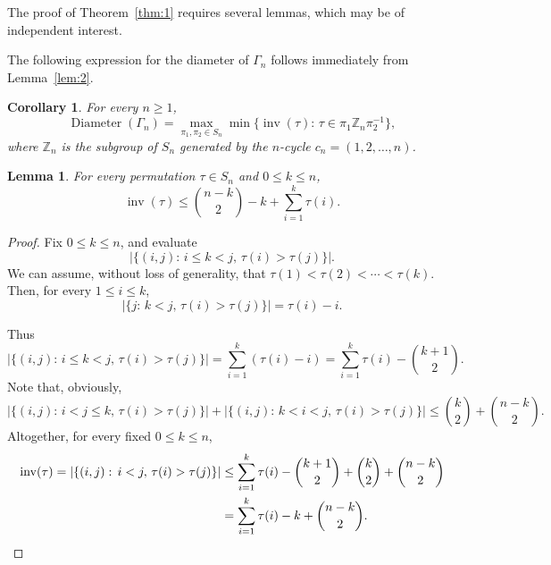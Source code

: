 \documentclass[11pt]{amsart}
\newtheorem{lemma}[theorem]{Lemma}
\newtheorem{corollary}[theorem]{Corollary}
\numberwithin{equation}{section}
\newcommand{\todo}[1]{\vspace{5 mm}\par \noindent
\marginpar{\textsc{ToDo}} \framebox{\begin{minipage}[c]{0.95
\textwidth}
 #1 \end{minipage}}\vspace{5 mm}\par}
\newcommand{\ZZ}{{\mathbb {Z}}}
\newcommand{\inv}{{\operatorname{inv}}}
\newcommand{\D}{{\operatorname{Diameter}}}
\begin{document}
The proof of Theorem~\ref{thm:1} requires several lemmas, which may be of independent interest. 

The following expression for the diameter of $\Gamma_n$ follows immediately from Lemma~\ref{lem:2}.

\begin{corollary}\label{cor:diam} 
For every $n\ge 1$,
    \[
        \D(\Gamma_n)
        = \max_{\pi_1,\pi_2 \in S_n} \min \{\inv(\tau) :\, \tau \in \pi_1 \ZZ_n \pi_2^{-1}\},
    \]
    where $\ZZ_n$ is the subgroup of $S_n$ generated by the $n$-cycle $c_n =(1,2,\dots,n)$.
\end{corollary}

\begin{lemma}\label{obs:4}
For every permutation $\tau\in S_n$ and $0\le k\le n$, 
\[
    \inv(\tau)
    \le \binom{n-k}{2}-k + \sum_{i=1}^k \tau(i).  
\]
\end{lemma}

\begin{proof} 
Fix $0\le k\le n$, and evaluate 
\[
   |\{(i,j) :\, i\le k<j,\, \tau(i)>\tau(j)\}|. 
\]
We can assume, without loss of generality, that $\tau(1)<\tau(2)<\cdots<\tau(k)$. 
Then, for every $1\le i\le k$,
\[
    |\{j :\, k<j,\, \tau(i)>\tau(j)\}|=\tau(i)-i.
\]


Thus  
\[
   |\{(i,j) :\, i\le k<j,\, \tau(i)>\tau(j)\}| 
   = \sum_{i=1}^k (\tau(i)-i)
   = \sum_{i=1}^k \tau(i) - \binom{k+1}{2}.
\]
Note that, obviously, 
\[
    |\{(i,j) :\, i< j \le k,\, \tau(i)>\tau(j)\}| +
    |\{(i,j) :\, k < i < j,\, \tau(i)>\tau(j)\}|
    \le \binom{k}{2} + \binom{n-k}{2}. 
\]
Altogether, 
for every fixed $0\le k\le n$,
\begin{align*}
    \inv(\tau)
    = |\{(i,j) :\, i<j,\, \tau(i)>\tau(j)\}| 
    &\le \sum_{i=1}^k \tau(i) - \binom{k+1}{2} + \binom{k}{2} + \binom{n-k}{2} \\
    &= \sum_{i=1}^k \tau(i) - k + \binom{n-k}{2}.
    \qedhere
\end{align*}
\end{proof}
\end{document}
